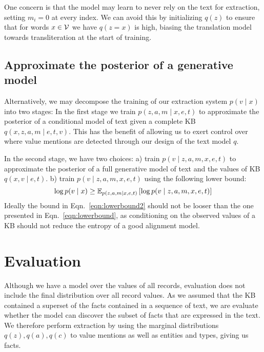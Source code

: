 \documentclass[12pt]{article}
\begin{document}
One concern is that the model may learn to never rely on the text for extraction,
setting $m_i = 0$ at every index.
We can avoid this by initializing $q(z)$ to ensure that for words $x \in \mathcal{V}$ 
we have $q(z = x)$ is high, biasing the translation model towards transliteration
at the start of training.

\subsection{Approximate the posterior of a generative model}
Alternatively, we may decompose the training of our extraction system $p(v\mid x)$ into two stages:
In the first stage we train $p(z,a,m\mid x,e,t)$ to approximate the posterior
of a conditional model of text given a complete KB $q(x,z,a,m \mid e,t,v)$.
This has the benefit of allowing us to exert control over where value mentions are detected
through our design of the text model $q$.

In the second stage, we have two choices:
a) train $p(v \mid z,a,m,x,e,t)$ to approximate the posterior of a full generative model of text and
the values of KB $q(x,v\mid e,t)$.
b) train $p(v \mid z,a,m,x,e,t)$ using the following lower bound:
\begin{equation}
\label{eqn:lowerbound2}
\log p(v\mid x) \geq
\mathbb{E}_{p(z,a,m\mid x,e,t)}\left[\log p(v\mid z,a,m, x,e,t)\right]
\end{equation}
Ideally the bound in Eqn.~\ref{eqn:lowerbound2}
should not be looser than the one presented in Eqn.~\ref{eqn:lowerbound},
as conditioning on the observed values of a KB should not reduce the entropy of
a good alignment model.

\section{Evaluation}
Although we have a model over the values of all records,
evaluation does not include the final distribution over all record values.
As we assumed that the KB contained a superset of the facts contained in
a sequence of text, we are evaluate whether the model can discover the subset of facts that 
are expressed in the text.
We therefore perform extraction by using the marginal distributions
$q(z),q(a),q(c)$ to value mentions as well as entities and types,
giving us facts.



\end{document}
